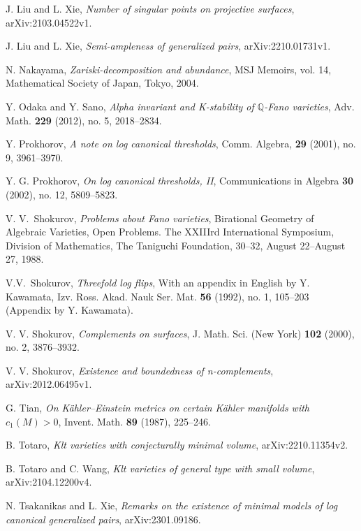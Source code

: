 \documentclass[11pt]{amsart}
\numberwithin{equation}{section}
\theoremstyle{definition}
\theoremstyle{definition}
\theoremstyle{definition}
\begin{document}
\begin{thebibliography}{ABCDE}
 J. Liu and L. Xie, \textit{Number of singular points on projective surfaces}, arXiv:2103.04522v1.

 J. Liu and L. Xie, \textit{Semi-ampleness of generalized pairs}, arXiv:2210.01731v1.

 N. Nakayama, \textit{Zariski-decomposition and abundance}, MSJ Memoirs, vol. 14, Mathematical Society of Japan, Tokyo, 2004.

 Y. Odaka and Y. Sano, \textit{Alpha invariant and K-stability of $\mathbb Q$-Fano varieties},  Adv. Math. \textbf{229} (2012), no. 5, 2018--2834.

 Y. Prokhorov, \textit{A note on log canonical thresholds}, Comm. Algebra, \textbf{29} (2001), no. 9, 3961--3970.

 Y. G. Prokhorov, \textit{On log canonical thresholds, II}, Communications in Algebra \textbf{30} (2002), no. 12, 5809--5823.

 V. V.~Shokurov, \textit{Problems about Fano varieties}, Birational Geometry of Algebraic Varieties, Open Problems. The XXIIIrd International Symposium, Division of Mathematics, The Taniguchi Foundation, 30--32, August 22--August 27, 1988.

 V.V.~Shokurov, \textit{Threefold log flips}, With an appendix in English by Y. Kawamata, Izv. Ross. Akad. Nauk Ser. Mat. \textbf{56} (1992), no. 1, 105--203 (Appendix by Y. Kawamata).


 V. V. Shokurov, \textit{Complements on surfaces}, J. Math. Sci. (New York) \textbf{102} (2000), no. 2, 3876--3932.

 V. V. Shokurov, \textit{Existence and boundedness of n-complements}, arXiv:2012.06495v1.

 G. Tian, \textit{On K\"ahler–Einstein metrics on certain K\"ahler manifolds with $c_1(M)>0$}, Invent. Math. \textbf{89} (1987), 225--246.

 B. Totaro, \textit{Klt varieties with conjecturally minimal volume}, arXiv:2210.11354v2.

 B. Totaro and C. Wang, \textit{Klt varieties of general type with small volume}, arXiv:2104.12200v4.


 N. Tsakanikas and L. Xie, \textit{Remarks on the existence of minimal models of log canonical generalized pairs}, arXiv:2301.09186.
\end{thebibliography}
\end{document}
